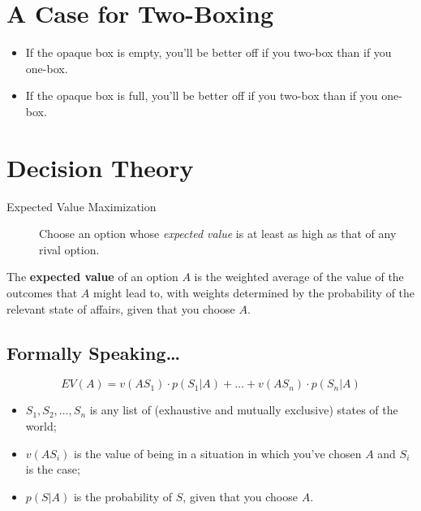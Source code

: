 \documentclass[12pt]{extarticle}
\begin{document}
\section{A Case for Two-Boxing}


\begin{itemize}
\item
  If the opaque box is empty, you'll be better off if you two-box than if you
  one-box.
\item
  If the opaque box is full, you'll be better off if you two-box
  than if you one-box.
  
\end{itemize}


\section{Decision Theory}



\vspace{4mm}
\begin{description}
\item[Expected Value Maximization]
Choose an option whose \emph{expected value} is at least as high as that of any rival option.\label{gloss:evm}
\end{description}
The \textbf{expected value} of an option $A$ is the weighted average of the value of the outcomes that $A$ might lead to, with weights determined by the probability of the relevant state of affairs, given that you choose $A$.\label{gloss:ev} 

\subsection{Formally Speaking\dots}
\[
EV(A) = v(A S_1) \cdot p(S_1|{}A) + 
 \ldots + 
v(A S_n) \cdot p(S_n|{}A)
\]
\begin{itemize}

\item $S_1, S_2,\ldots, S_n$ is any list of (exhaustive and mutually exclusive) states of the world;

\item $v(A S_i)$ is the value of being in a situation in which you've chosen $A$ and $S_i$ is the case;

\item $p(S|A)$ is the probability of $S$, given that you choose $A$.\label{gloss:cond-prob5}

\end{itemize}
\end{document}
